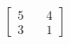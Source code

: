 \documentclass[preview]{standalone}
\begin{document}
\begin{align*}
\begin{bmatrix} 5 & \quad 4 \\ 3 & \quad 1 \end{bmatrix}
\end{align*}
\end{document}
